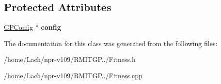 \subsection*{Protected Attributes}
\begin{DoxyCompactItemize}
\item 
\hypertarget{classFitness_af8b8f65772f11313377f15acfcba8ec3}{}\label{classFitness_af8b8f65772f11313377f15acfcba8ec3} 
\hyperlink{classGPConfig}{G\+P\+Config} $\ast$ {\bfseries config}
\end{DoxyCompactItemize}


The documentation for this class was generated from the following files\+:\begin{DoxyCompactItemize}
\item 
/home/\+Lach/npr-\/v109/\+R\+M\+I\+T\+G\+P../Fitness.\+h\item 
/home/\+Lach/npr-\/v109/\+R\+M\+I\+T\+G\+P../Fitness.\+cpp\end{DoxyCompactItemize}
